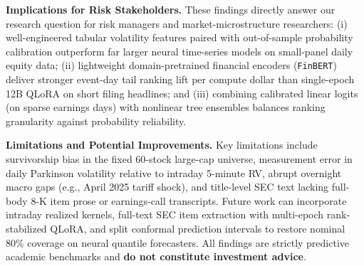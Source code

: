 \documentclass[11pt,a4paper]{article}
\begin{document}
\textbf{Implications for Risk Stakeholders.} These findings directly answer
our research question for risk managers and market-microstructure researchers:
(i) well-engineered tabular volatility features paired with out-of-sample
probability calibration outperform far larger neural time-series models on
small-panel daily equity data; (ii) lightweight domain-pretrained financial
encoders (\texttt{FinBERT}) deliver stronger event-day tail ranking lift per
compute dollar than single-epoch 12B QLoRA on short filing headlines; and (iii)
combining calibrated linear logits (on sparse earnings days) with nonlinear
tree ensembles balances ranking granularity against probability reliability.

\textbf{Limitations and Potential Improvements.} Key limitations include
survivorship bias in the fixed 60-stock large-cap universe, measurement error
in daily Parkinson volatility relative to intraday 5-minute RV, abrupt
overnight macro gaps (e.g., April 2025 tariff shock), and title-level SEC text
lacking full-body 8-K item prose or earnings-call transcripts. Future work can
incorporate intraday realized kernels, full-text SEC item extraction with
multi-epoch rank-stabilized QLoRA, and split conformal prediction intervals to
restore nominal 80\% coverage on neural quantile forecasters. All findings are
strictly predictive academic benchmarks and \textbf{do not constitute
investment advice}.

\clearpage
{\small
{}


}

\clearpage
\end{document}
